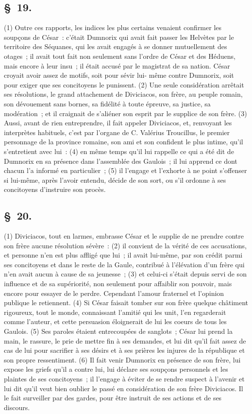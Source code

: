 \documentclass[french,twoside]{book} %
\begin{document}
\subsection[{§ 19.}]{ \textsc{§ 19.} }
\noindent (1) Outre ces rapports, les indices les plus certains venaient confirmer les soupçons de César : c’était Dumnorix qui avait fait passer les Helvètes par le territoire des Séquanes, qui les avait engagés à se donner mutuellement des otages ; il avait tout fait non seulement sans l’ordre de César et des Héduens, mais encore à leur insu ; il était accusé par le magistrat de sa nation. César croyait avoir assez de motifs, soit pour sévir lui- même contre Dumnorix, soit pour exiger que ses concitoyens le punissent. (2) Une seule considération arrêtait ses résolutions, le grand attachement de Diviciacos, son frère, au peuple romain, son dévouement sans bornes, sa fidélité à toute épreuve, sa justice, sa modération ; et il craignait de s’aliéner son esprit par le supplice de son frère. (3) Aussi, avant de rien entreprendre, il fait appeler Diviciacos, et, renvoyant les interprètes habituels, c’est par l’organe de C. Valérius Troucillus, le premier personnage de la province romaine, son ami et son confident le plus intime, qu’il s’entretient avec lui : (4) en même temps qu’il lui rappelle ce qui a été dit de Dumnorix en sa présence dans l’assemblée des Gaulois ; il lui apprend ce dont chacun l’a informé en particulier ; (5) il l’engage et l’exhorte à ne point s’offenser si lui-même, après l’avoir entendu, décide de son sort, ou s’il ordonne à ses concitoyens d’instruire son procès.
\subsection[{§ 20.}]{ \textsc{§ 20.} }
\noindent (1) Diviciacos, tout en larmes, embrasse César et le supplie de ne prendre contre son frère aucune résolution sévère : (2) il convient de la vérité de ces accusations, et personne n’en est plus affligé que lui ; il avait lui-même, par son crédit parmi ses concitoyens et dans le reste de la Gaule, contribué à l’élévation d’un frère qui n’en avait aucun à cause de sa jeunesse ; (3) et celui-ci s’était depuis servi de son influence et de sa supériorité, non seulement pour affaiblir son pouvoir, mais encore pour essayer de le perdre. Cependant l’amour fraternel et l’opinion publique le retiennent. (4) Si César faisait tomber sur son frère quelque châtiment rigoureux, tout le monde, connaissant l’amitié qui les unit, l’en regarderait comme l’auteur, et cette persuasion éloignerait de lui les coeurs de tous les Gaulois. (5) Ses paroles étaient entrecoupées de sanglots ; César lui prend la main, le rassure, le prie de mettre fin à ses demandes, et lui dit qu’il fait assez de cas de lui pour sacrifier à ses désirs et à ses prières les injures de la république et son propre ressentiment. (6) Il fait venir Dumnorix en présence de son frère, lui expose les griefs qu’il a contre lui, lui déclare ses soupçons personnels et les plaintes de ses concitoyens ; il l’engage à éviter de se rendre suspect à l’avenir et lui dit qu’il veut bien oublier le passé en considération de son frère Diviciacos. Il le fait surveiller par des gardes, pour être instruit de ses actions et de ses discours.
\end{document}

